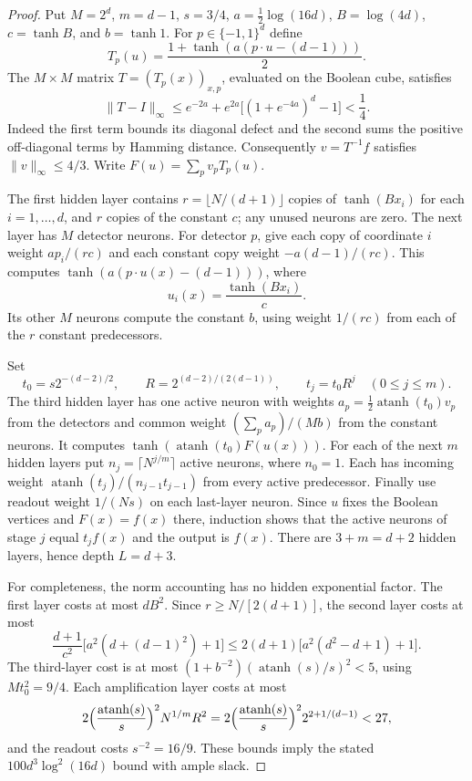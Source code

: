 \begin{proof}
Put $M=2^d$, $m=d-1$, $s=3/4$, $a=\tfrac12\log(16d)$,
$B=\log(4d)$, $c=\tanh B$, and $b=\tanh1$.
For $p\in\{-1,1\}^d$ define
\[
 T_p(u)=\frac{1+\tanh(a(p\cdot u-(d-1)))}2.
\]
The $M\times M$ matrix $T=(T_p(x))_{x,p}$, evaluated on the Boolean cube,
satisfies
\[
 \|T-I\|_\infty
 \le e^{-2a}+e^{2a}\bigl[(1+e^{-4a})^d-1\bigr]<\frac14.
\]
Indeed the first term bounds its diagonal defect and the second sums the
positive off-diagonal terms by Hamming distance.
Consequently $v=T^{-1}f$ satisfies $\|v\|_\infty\le4/3$.
Write $F(u)=\sum_pv_pT_p(u)$.

The first hidden layer contains $r=\lfloor N/(d+1)\rfloor$ copies of
$\tanh(Bx_i)$ for each $i=1,\ldots,d$, and $r$ copies of the constant $c$;
any unused neurons are zero. The next layer has $M$ detector neurons. For
detector $p$, give each copy of coordinate $i$ weight $ap_i/(rc)$ and each
constant copy weight $-a(d-1)/(rc)$. This computes
$\tanh(a(p\cdot u(x)-(d-1)))$, where
\[
 u_i(x)=\frac{\tanh(Bx_i)}c.
\]
Its other $M$ neurons compute the constant $b$, using weight $1/(rc)$ from
each of the $r$ constant predecessors.

Set
\[
 t_0=s2^{-(d-2)/2},\qquad
 R=2^{(d-2)/(2(d-1))},\qquad t_j=t_0R^j\quad(0\le j\le m).
\]
The third hidden layer has one active neuron with weights
$a_p=\tfrac12\operatorname{atanh}(t_0)v_p$ from the detectors and common
weight $(\sum_pa_p)/(Mb)$ from the constant neurons. It computes
$\tanh(\operatorname{atanh}(t_0)F(u(x)))$.
For each of the next $m$ hidden layers put $n_j=\lceil N^{j/m}\rceil$ active
neurons, where $n_0=1$. Each has incoming weight
$\operatorname{atanh}(t_j)/(n_{j-1}t_{j-1})$ from every active predecessor.
Finally use readout weight $1/(Ns)$ on each last-layer neuron.
Since $u$ fixes the Boolean vertices and $F(x)=f(x)$ there, induction shows
that the active neurons of stage $j$ equal $t_jf(x)$ and the output is $f(x)$.
There are $3+m=d+2$ hidden layers, hence depth $L=d+3$.

For completeness, the norm accounting has no hidden exponential factor.
The first layer costs at most $dB^2$. Since $r\ge N/[2(d+1)]$, the second
layer costs at most
\[
 \frac{d+1}{c^2}\bigl[a^2(d+(d-1)^2)+1\bigr]
 \le2(d+1)\bigl[a^2(d^2-d+1)+1\bigr].
\]
The third-layer cost is at most
$(1+b^{-2})(\operatorname{atanh}(s)/s)^2<5$, using $Mt_0^2=9/4$.
Each amplification layer costs at most
\[
 2\Bigl(\frac{\operatorname{atanh}(s)}s\Bigr)^2N^{1/m}R^2
 =2\Bigl(\frac{\operatorname{atanh}(s)}s\Bigr)^2
     2^{2+1/(d-1)}<27,
\]
and the readout costs $s^{-2}=16/9$. These bounds imply the stated
$100d^3\log^2(16d)$ bound with ample slack.


\end{proof}
